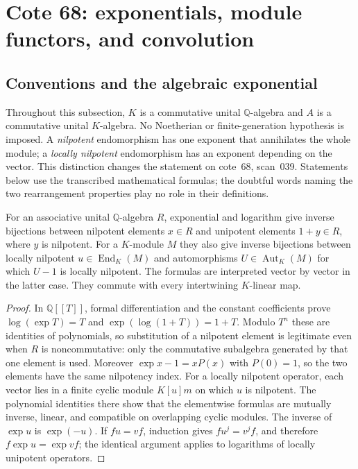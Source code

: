 \section{Cote 68: exponentials, module functors, and convolution}
\label{sec:C}

\subsection{Conventions and the algebraic exponential}
Throughout this subsection, $K$ is a commutative unital $\mathbb Q$-algebra and $A$ is a commutative unital $K$-algebra. No Noetherian or finite-generation hypothesis is imposed. A \emph{nilpotent} endomorphism has one exponent that annihilates the whole module; a \emph{locally nilpotent} endomorphism has an exponent depending on the vector. This distinction changes the statement on cote~68, scan~039. Statements below use the transcribed mathematical formulas; the doubtful words naming the two rearrangement properties play no role in their definitions.

\begin{lemma}
\label{C:explog}
For an associative unital $\mathbb Q$-algebra $R$, exponential and logarithm give inverse bijections between nilpotent elements $x\in R$ and unipotent elements $1+y\in R$, where $y$ is nilpotent. For a $K$-module $M$ they also give inverse bijections between locally nilpotent $u\in\operatorname{End}_K(M)$ and automorphisms $U\in\operatorname{Aut}_K(M)$ for which $U-1$ is locally nilpotent. The formulas are interpreted vector by vector in the latter case. They commute with every intertwining $K$-linear map.
\end{lemma}
\begin{proof}
In $\mathbb Q[[T]]$, formal differentiation and the constant coefficients prove
$\log(\exp T)=T$ and $\exp(\log(1+T))=1+T$. Modulo $T^n$ these are identities of polynomials, so substitution of a nilpotent element is legitimate even when $R$ is noncommutative: only the commutative subalgebra generated by that one element is used. Moreover $\exp x-1=xP(x)$ with $P(0)=1$, so the two elements have the same nilpotency index. For a locally nilpotent operator, each vector lies in a finite cyclic module $K[u]m$ on which $u$ is nilpotent. The polynomial identities there show that the elementwise formulas are mutually inverse, linear, and compatible on overlapping cyclic modules. The inverse of $\exp u$ is $\exp(-u)$. If $fu=vf$, induction gives $fu^j=v^jf$, and therefore $f\exp u=\exp v f$; the identical argument applies to logarithms of locally unipotent operators.
\end{proof}


